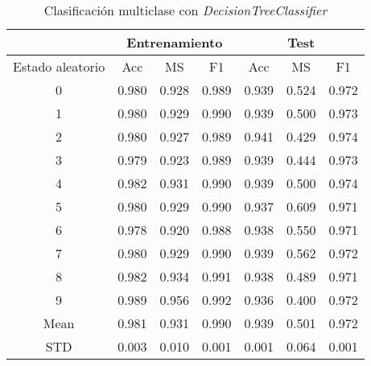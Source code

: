 \begin{table}[th]
	\centering
	\begin{tabular}{ |c|c|c|c|c|c|c| }
		\hline
		\rowcolor{LightCyan}
		 & \multicolumn{3}{c|}{Entrenamiento} & \multicolumn{3}{c|}{Test} \\
		\hline
		\rowcolor{LightCyan}
		 Estado aleatorio & Acc & MS & F1 & Acc & MS & F1 \\
		\hline
		0 & 0.980 & 0.928 & 0.989 & 0.939 & 0.524 & 0.972 \\
		1 & 0.980 & 0.929 & 0.990 & 0.939 & 0.500 & 0.973 \\
		2 & 0.980 & 0.927 & 0.989 & 0.941 & 0.429 & 0.974 \\
		3 & 0.979 & 0.923 & 0.989 & 0.939 & 0.444 & 0.973 \\
		4 & 0.982 & 0.931 & 0.990 & 0.939 & 0.500 & 0.974 \\
		5 & 0.980 & 0.929 & 0.990 & 0.937 & 0.609 & 0.971 \\
		6 & 0.978 & 0.920 & 0.988 & 0.938 & 0.550 & 0.971 \\
		7 & 0.980 & 0.929 & 0.990 & 0.939 & 0.562 & 0.972 \\
		8 & 0.982 & 0.934 & 0.991 & 0.938 & 0.489 & 0.971 \\
		9 & 0.989 & 0.956 & 0.992 & 0.936 & 0.400 & 0.972 \\
		Mean & 0.981 & 0.931 & 0.990 & 0.939 & 0.501 & 0.972 \\
		STD & 0.003 & 0.010 & 0.001 & 0.001 & 0.064 & 0.001 \\
		\hline
	\end{tabular}
	\caption{Clasificación multiclase con \textit{DecisionTreeClassifier}}
	\label{tabla:dt_multi}
\end{table}
